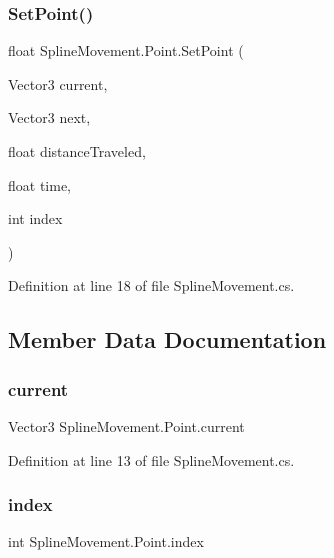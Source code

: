 \subsubsection{\texorpdfstring{Set\+Point()}{SetPoint()}}
{\footnotesize\ttfamily float Spline\+Movement.\+Point.\+Set\+Point (\begin{DoxyParamCaption}\item[{Vector3}]{current,  }\item[{Vector3}]{next,  }\item[{float}]{distance\+Traveled,  }\item[{float}]{time,  }\item[{int}]{index }\end{DoxyParamCaption})}



Definition at line 18 of file Spline\+Movement.\+cs.



\subsection{Member Data Documentation}
\mbox{\label{class_spline_movement_1_1_point_a136b7b26549bbba4898b4f42f0c69222}} 
\subsubsection{\texorpdfstring{current}{current}}
{\footnotesize\ttfamily Vector3 Spline\+Movement.\+Point.\+current}



Definition at line 13 of file Spline\+Movement.\+cs.

\mbox{\label{class_spline_movement_1_1_point_a1060d9de3422a4fbdae9f7e316366cb3}} 
\subsubsection{\texorpdfstring{index}{index}}
{\footnotesize\ttfamily int Spline\+Movement.\+Point.\+index}




